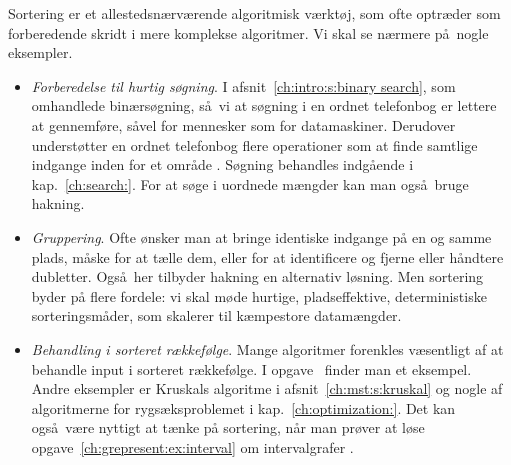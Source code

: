 Sortering er et allestedsnærværende algoritmisk værktøj, som ofte optræder som forberedende skridt
i mere komplekse algoritmer.
Vi skal se nærmere på nogle eksempler.

\begin{itemize}
\item 
\emph{Forberedelse til hurtig søgning}.
  I afsnit~\ref{ch:intro:s:binary search}, som omhandlede binærsøgning, så vi at søgning i en ordnet telefonbog er lettere at gennemføre, såvel for mennesker som for datamaskiner.
Derudover understøtter en ordnet telefonbog flere operationer som at finde samtlige indgange inden for et område .
Søgning behandles indgående i kap.~\ref{ch:search:}.
For at søge i uordnede mængder kan man også bruge hakning.
\item \emph{Gruppering}.
Ofte ønsker man at bringe identiske indgange på en og samme plads, måske for at tælle dem, eller for at identificere og fjerne eller håndtere dubletter.
  Også her tilbyder hakning en alternativ løsning. 
Men sortering byder på flere fordele: vi skal møde hurtige, pladseffektive, deterministiske 
sorteringsmåder, som skalerer til kæmpestore datamængder.
\item \emph{Behandling i sorteret rækkefølge}.
Mange algoritmer forenkles væsentligt af at behandle input i sorteret rækkefølge.
I opgave~ finder man et eksempel. 
Andre eksempler er Kruskals algoritme i afsnit~\ref{ch:mst:s:kruskal}  og nogle af algoritmerne for rygsæksproblemet i kap.~\ref{ch:optimization:}.
Det kan også være nyttigt at tænke på sortering, når man prøver at løse opgave~\ref{ch:grepresent:ex:interval} om intervalgrafer .
\end{itemize}

